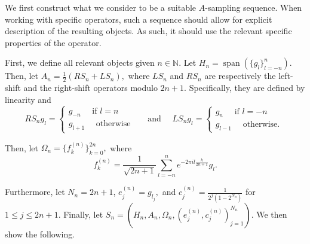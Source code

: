 \documentclass[10pt,a4paper]{amsart}
\def \Span{\operatorname{span}}
\begin{document}

We first construct what we consider to be a suitable $A$-sampling sequence. When working with specific operators, such a sequence should allow for explicit description of the resulting objects. As such, it should use the relevant specific properties of the operator.

First, we define all relevant objects given $n\in\mathbb{N}$. Let $H_n=\Span(\{g_l\}_{l=-n}^n)$. Then, let $A_n=\frac{1}{2}(RS_n+LS_n),$ where $LS_n$ and $RS_n$ are respectively the left-shift and the right-shift operators modulo $2n+1$. Specifically, they are defined by linearity and $$RS_n g_l=\begin{cases}
	g_{-n} \quad \text{ if $l=n$ }\\
	g_{l+1} \quad \text{ otherwise }
\end{cases} \quad \text{ and }\quad LS_ng_l=\begin{cases}
g_n \quad \text{ if $l=-n$ }\\
g_{l-1}\quad \text{ otherwise. }
\end{cases}$$

Then, let $\Omega_n=\{f_k^{(n)}\}_{k=0}^{2n},$ where $$f_k^{(n)}=\frac{1}{\sqrt{2n+1}}\sum_{l=-n}^n e^{-2\pi i l \frac{k}{2n+1}}g_l.$$

Furthermore, let $N_n=2n+1$, $e_j^{(n)}=g_{l_j},$ and $c_j^{(n)}=\frac{1}{2^j(1-2^{N_n})}$ for $1\leq j\leq 2n+1.$ Finally, let $S_n=(H_n,A_n,\Omega_n, (e_j^{(n)},c_j^{(n)})_{j=1}^{N_n}).$ We then show the following.
\end{document}
